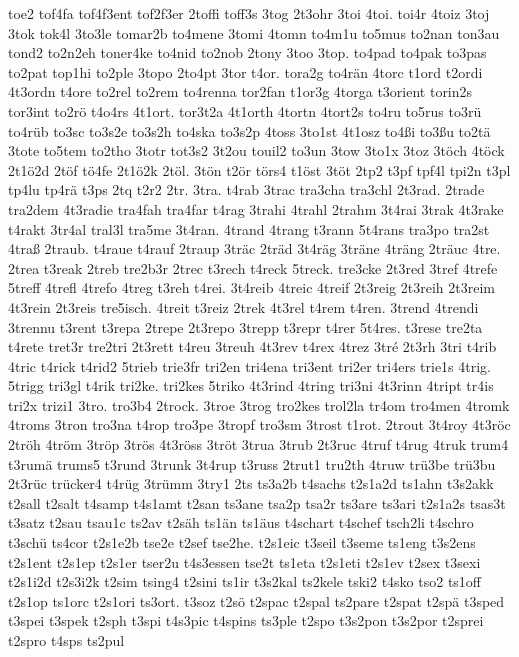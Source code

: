 {toe2
tof4fa
tof4f3ent
tof2f3er
2toffi
toff3s
3tog
2t3ohr
3toi
4toi.
toi4r
4toiz
3toj
3tok
tok4l
3to3le
tomar2b
to4mene
3tomi
4tomn
to4m1u
to5mus
to2nan
ton3au
tond2
to2n2eh
toner4ke
to4nid
to2nob
2tony
3too
3top.
to4pad
to4pak
to3pas
to2pat
top1hi
to2ple
3topo
2to4pt
3tor
t4or.
tora2g
to4rän
4torc
t1ord
t2ordi
4t3ordn
t4ore
to2rel
to2rem
to4renna
tor2fan
t1or3g
4torga
t3orient
torin2s
tor3int
to2rö
t4o4rs
4t1ort.
tor3t2a
4t1orth
4tortn
4tort2s
to4ru
to5rus
to3rü
to4rüb
to3sc
to3s2e
to3s2h
to4ska
to3s2p
4toss
3to1st
4t1osz
to4ßi
to3ßu
to2tä
3tote
to5tem
to2tho
3totr
tot3s2
3t2ou
touil2
to3un
3tow
3to1x
3toz
3töch
4töck
2t1ö2d
2töf
tö4fe
2t1ö2k
2töl.
3tön
t2ör
törs4
t1öst
3töt
2tp2
t3pf
tpf4l
tpi2n
t3pl
tp4lu
tp4rä
t3ps
2tq
t2r2
2tr.
3tra.
t4rab
3trac
tra3cha
tra3chl
2t3rad.
2trade
tra2dem
4t3radie
tra4fah
tra4far
t4rag
3trahi
4trahl
2trahm
3t4rai
3trak
4t3rake
t4rakt
3tr4al
tral3l
tra5me
3t4ran.
4trand
4trang
t3rann
5t4rans
tra3po
tra2st
4traß
2traub.
t4raue
t4rauf
2traup
3träc
2träd
3t4räg
3träne
4träng
2träuc
4tre.
2trea
t3reak
2treb
tre2b3r
2trec
t3rech
t4reck
5treck.
tre3cke
2t3red
3tref
4trefe
5treff
4trefl
4trefo
4treg
t3reh
t4rei.
3t4reib
4treic
4treif
2t3reig
2t3reih
2t3reim
4t3rein
2t3reis
tre5isch.
4treit
t3reiz
2trek
4t3rel
t4rem
t4ren.
3trend
4trendi
3trennu
t3rent
t3repa
2trepe
2t3repo
3trepp
t3repr
t4rer
5t4res.
t3rese
tre2ta
t4rete
tret3r
tre2tri
2t3rett
t4reu
3treuh
4t3rev
t4rex
4trez
3tré
2t3rh
3tri
t4rib
4tric
t4rick
t4rid2
5trieb
trie3fr
tri2en
tri4ena
tri3ent
tri2er
tri4ers
trie1s
4trig.
5trigg
tri3gl
t4rik
tri2ke.
tri2kes
5triko
4t3rind
4tring
tri3ni
4t3rinn
4tript
tr4is
tri2x
trizi1
3tro.
tro3b4
2trock.
3troe
3trog
tro2kes
trol2la
tr4om
tro4men
4tromk
4troms
3tron
tro3na
t4rop
tro3pe
3tropf
tro3sm
3trost
t1rot.
2trout
3t4roy
4t3röc
2tröh
4tröm
3tröp
3trös
4t3röss
3tröt
3trua
3trub
2t3ruc
4truf
t4rug
4truk
trum4
t3rumä
trums5
t3rund
3trunk
3t4rup
t3russ
2trut1
tru2th
4truw
trü3be
trü3bu
2t3rüc
trücker4
t4rüg
3trümm
3try1
2ts
ts3a2b
t4sachs
t2s1a2d
ts1ahn
t3s2akk
t2sall
t2salt
t4samp
t4s1amt
t2san
ts3ane
tsa2p
tsa2r
ts3are
ts3ari
t2s1a2s
tsas3t
t3satz
t2sau
tsau1c
ts2av
t2säh
ts1än
ts1äus
t4schart
t4schef
tsch2li
t4schro
t3schü
ts4cor
t2s1e2b
tse2e
t2sef
tse2he.
t2s1eic
t3seil
t3seme
ts1eng
t3s2ens
t2s1ent
t2s1ep
t2s1er
tser2u
t4s3essen
tse2t
ts1eta
t2s1eti
t2s1ev
t2sex
t3sexi
t2s1i2d
t2s3i2k
t2sim
tsing4
t2sini
ts1ir
t3s2kal
ts2kele
tski2
t4sko
tso2
ts1off
t2s1op
ts1orc
t2s1ori
ts3ort.
t3soz
t2sö
t2spac
t2spal
ts2pare
t2spat
t2spä
t3sped
t3spei
t3spek
t2sph
t3spi
t4s3pic
t4spins
ts3ple
t2spo
t3s2pon
t3s2por
t2sprei
t2spro
t4sps
ts2pul
}
